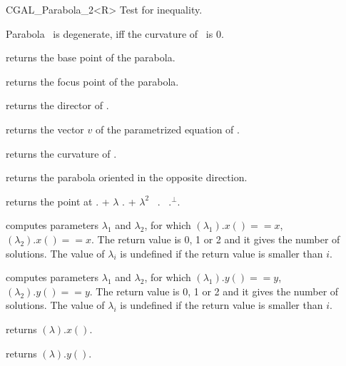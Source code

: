 \begin {classtemplate} {CGAL_Parabola_2<R>}
       {Test for inequality.}



       {Parabola \var\ is degenerate, iff the curvature of \var\ is 0.}

       {returns the base point of the parabola.}

       {returns the focus point of the parabola.}

       {returns the director of \var.}

       {returns the vector $v$ of the parametrized equation of \var.}

       { returns the curvature of \var.}

       {returns the parabola oriented in the opposite direction.}
	
       {returns the point at \var. + $\lambda$ \var.
        + $\lambda^2$ \, \var. \, \var.$^\perp$.}

       {computes parameters $\lambda_1$ and $\lambda_2$, for which 
        \var$(\lambda_1).x()==x$, \var$(\lambda_2).x()==x$. The return
        value is 0, 1 or 2 and it gives the number of  solutions.
        The value of $\lambda_i$  is undefined if the
        return value is smaller than $i$.}

       {computes parameters $\lambda_1$ and $\lambda_2$, for which 
        \var$(\lambda_1).y()==y$, \var$(\lambda_2).y()==y$. The return
        value is 0, 1 or 2 and it gives the number of solutions.
        The value of $\lambda_i$  is undefined if the
        return value is smaller than $i$.}

       {returns \var$(\lambda).x()$.}

       {returns \var$(\lambda).y()$.}


\end{classtemplate}
